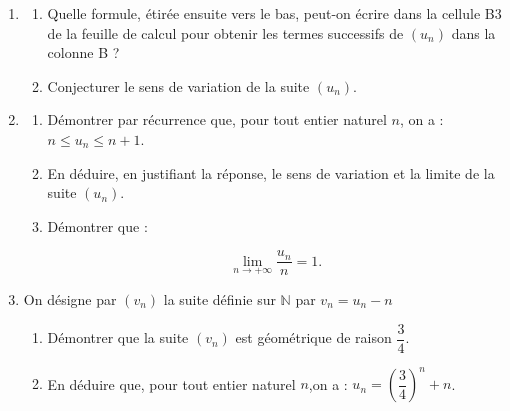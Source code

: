 \documentclass[10pt]{article}
\providecommand{\N}{\mathbb{N}}
\begin{document}
\begin{enumerate}[resume]
\item
	\begin{enumerate}
		\item Quelle formule, étirée ensuite vers le bas, peut-on écrire dans la cellule B3 de la feuille de calcul pour obtenir les termes successifs de $\left(u_n\right)$ dans la colonne B ?
		\item Conjecturer le sens de variation de la suite $\left(u_n\right)$.
	\end{enumerate}
\item
	\begin{enumerate}
		\item Démontrer par récurrence que, pour tout entier naturel $n$, on a : $n \leqslant u_n \leqslant n + 1$.
		\item En déduire, en justifiant la réponse, le sens de variation et la limite de la suite 
		$\left(u_n\right)$.
		\item Démontrer que :
		
\[\displaystyle\lim_{n \to + \infty} \dfrac{u_n}{n} = 1.\]

	\end{enumerate}
\item  On désigne par $\left(v_n\right)$ la suite définie sur $\N$ par $v_n = u_n - n$
	\begin{enumerate}
		\item Démontrer que la suite $\left(v_n\right)$ est géométrique de raison $\dfrac{3}{4}$.
		\item En déduire que, pour tout entier naturel $n$,on a : $u_n = \left(\dfrac{3}{4}\right)^n + n$.
	\end{enumerate}
\end{enumerate}

\bigskip
\end{document}
